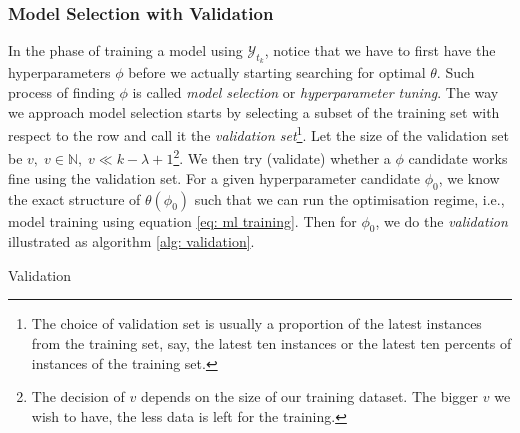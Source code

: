 \subsubsection{Model Selection with Validation}
In the phase of training a model using $\mathcal{Y}_{t_k}$, notice that we have to first have the hyperparameters $\phi$ before we actually starting searching for optimal $\theta$. Such process of finding $\phi$ is called \textit{model selection} or \textit{hyperparameter tuning}. The way we approach model selection starts by selecting a subset of the training set with respect to the row and call it the \textit{validation set}\footnote{The choice of validation set is usually a proportion of the latest instances from the training set, say, the latest ten instances or the latest ten percents of instances of the training set.}. Let the size of the validation set be $v, \; v \in \mathbb{N}, \; v \ll k - \lambda + 1$\footnote{The decision of $v$ depends on the size of our training dataset. The bigger $v$ we wish to have, the less data is left for the training.}. We then try (validate) whether a $\phi$ candidate works fine using the validation set. For a given hyperparameter candidate $\phi_0$, we know the exact structure of $\theta(\phi_0)$ such that we can run the optimisation regime, i.e., model training using equation \ref{eq: ml training}. Then for $\phi_0$, we do the \textit{validation} illustrated as algorithm \ref{alg: validation}.
\begin{algorithm}[H]
    \caption{Validation}\label{alg: validation}
    \begin{algorithmic}
    \EndFor
    \end{algorithmic}
\end{algorithm}
